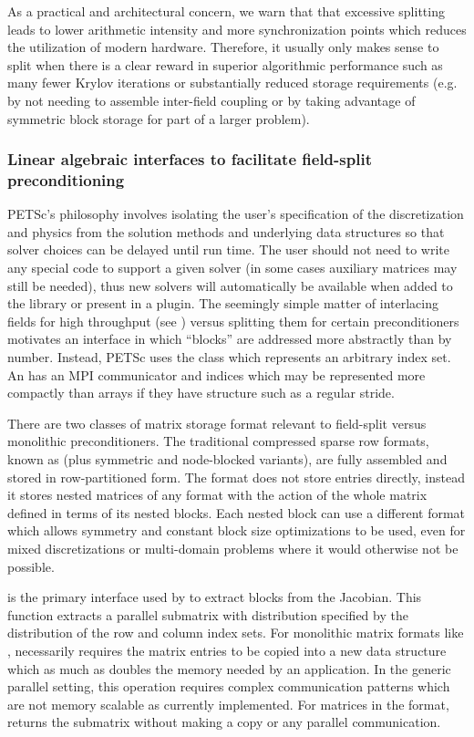 As a practical and architectural concern, we warn that that excessive splitting leads to lower arithmetic intensity and more synchronization points which reduces the utilization of modern hardware.
Therefore, it usually only makes sense to split when there is a clear reward in superior algorithmic performance such as many fewer Krylov iterations or substantially reduced storage requirements (e.g. by not needing to assemble inter-field coupling or by taking advantage of symmetric block storage for part of a larger problem).

\subsubsection{Linear algebraic interfaces to facilitate field-split preconditioning}
PETSc's philosophy involves isolating the user's specification of the discretization and physics from the solution methods and underlying data structures so that solver choices can be delayed until run time.
The user should not need to write any special code to support a given solver (in some cases auxiliary matrices may still be needed), thus new solvers will automatically be available when added to the library or present in a plugin.
The seemingly simple matter of interlacing fields for high throughput (see ) versus splitting them for certain preconditioners motivates an interface in which ``blocks'' are addressed more abstractly than by number.
Instead, PETSc uses the  class which represents an arbitrary index set.
An  has an MPI communicator and indices which may be represented more compactly than arrays if they have structure such as a regular stride.

There are two classes of matrix storage format relevant to field-split versus monolithic preconditioners.
The traditional compressed sparse row formats, known as  (plus symmetric and node-blocked variants), are fully assembled and stored in row-partitioned form.
The  format does not store entries directly, instead it stores nested matrices of any format with the action of the whole matrix defined in terms of its nested blocks.
Each nested block can use a different format which allows symmetry and constant block size optimizations to be used, even for mixed discretizations or multi-domain problems where it would otherwise not be possible.

 is the primary interface used by  to extract blocks from the Jacobian.
This function extracts a parallel submatrix with distribution specified by the distribution of the row and column index sets.
For monolithic matrix formats like ,  necessarily requires the matrix entries to be copied into a new data structure which as much as doubles the memory needed by an application.
In the generic parallel setting, this operation requires complex communication patterns which are not memory scalable as currently implemented.
For matrices in the  format,  returns the submatrix without making a copy or any parallel communication.

